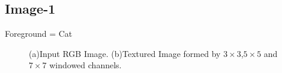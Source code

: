 \documentclass{article}
\begin{document}
\subsection{Image-1}
Foreground = Cat\\
\begin{figure}[!htbp]
     \centering
     \captionsetup[subfigure]{labelformat=empty}
    \caption{(a)Input RGB Image. (b)Textured Image formed by $3\times 3$,$5\times 5$ and $7\times 7$ windowed channels.}
    \label{fig:cat_1}
\end{figure}
\end{document}
